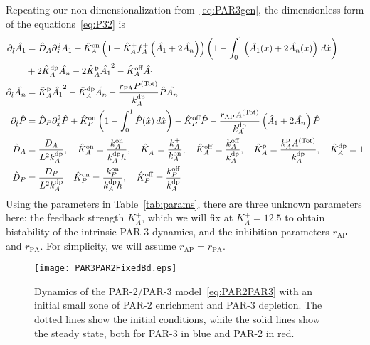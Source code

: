 \documentclass[11pt]{article}
\newcommand{\6}[1]{#1_{\text{6}}}
\newcommand{\3}[1]{#1_{\text{3}}}
\newcommand{\Tot}[1]{#1^\text{(Tot)}}
\newcommand{\A}[1]{#1_A}
\begin{document}
Repeating our non-dimensionalization from\ \eqref{eq:PAR3gen}, the dimensionless form of the equations\ \eqref{eq:P32} is
\begin{subequations}
\label{eq:PAR2PAR3}
\begin{align}
\nonumber
\Dthat \hat{\MA} & = \DhatA \Dxhat^2 \MA +\KhatonA \left(1+\KhatfA \A{f}^+\left(\hat{\MA}+2\hat{\PA}\right)\right)\left(1 - \int_0^1 \left(\hat{\MA}(x) + 2\hat{\PA}(x)\right) \, d\hat{x} \right) \\ 
&+ 2\KhatdpA \hat{\PA}-2\KhatpA \hat{\MA}^2 - \KhatoffA \hat{\MA} \\ 
\Dthat \hat{\PA} & =\KhatpA \hat{\MA}^2- \KhatdpA \hat{\PA}-\frac{r_\text{PA} \Tot{P}}{\kdp_A}\hat{P} \hat{\PA} \\ 
\Dthat \hat{P} & =\DhatP \Dxhat^2 \hat{P} +\KhatonP \left(1 - \int_0^1 \hat{P}(\hat x) \, d\hat{x} \right)  - \KhatoffP \hat{P}-\frac{r_\text{AP} \Tot{A}}{\kdp_A}\left(\hat A_1 + 2\hat \PA\right)\hat{P} \\ 
\label{eq:paramsNDFB}
\DhatA &=\frac{\A{D}}{L^2 \A{\kdp}}, \quad \KhatonA=\frac{\A{\kon}}{\A{\kdp} h }, \quad \KhatfA = \frac{\A{\kf}}{\A{\kon}}, \quad  \KhatoffA = \frac{\A{\koff}}{\A{\kdp}}, \quad \KhatpA = \frac{\A{\kp} \Tot{A}}{\A{\kdp}}, \quad \KhatdpA=1\\
\DhatP &=\frac{D_P}{L^2 \A{\kdp}} \quad \KhatonP=\frac{{\kon_P}}{\A{\kdp} h },\quad \KhatoffP = \frac{\koff_P}{\kdp_A}
\end{align}
\end{subequations}
Using the parameters in Table\ \ref{tab:params}, there are three unknown parameters here: the feedback strength $K_A^+$, which we will fix at $K_A^+=12.5$ to obtain bistability of the intrinsic PAR-3 dynamics, and the inhibition parameters $r_\text{AP}$ and $r_\text{PA}$. For simplicity, we will assume $r_\text{AP}=r_\text{PA}$. 

\begin{figure}
\centering
\texttt{[image: PAR3PAR2FixedBd.eps]}
\caption{\label{fig:P32FixBd}Dynamics of the PAR-2/PAR-3 model\ \eqref{eq:PAR2PAR3} with an initial small zone of PAR-2 enrichment and PAR-3 depletion. The dotted lines show the initial conditions, while the solid lines show the steady state, both for PAR-3 in blue and PAR-2 in red.}
\end{figure}
\end{document}

